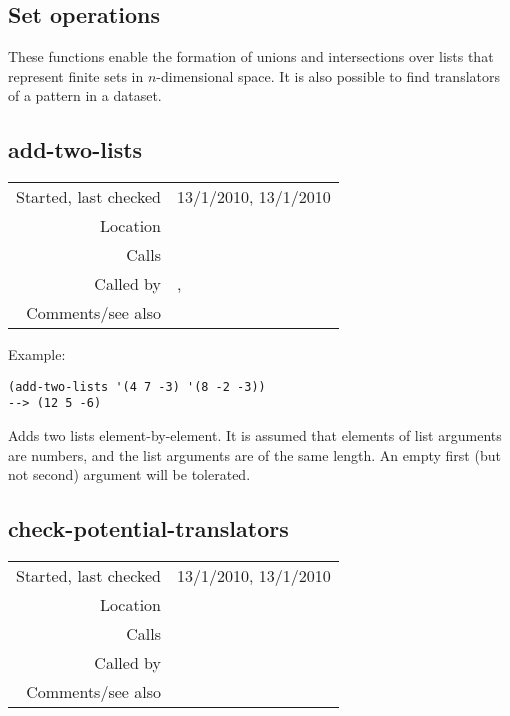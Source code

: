 \subsection{Set operations}\label{sec:set-operations}

These functions enable the formation of
unions and intersections over lists that represent
finite sets in $n$-dimensional space. It is also
possible to find translators of a pattern in a
dataset.


\subsection*{add-two-lists}\label{fun:add-two-lists}

\vspace{0.3cm}
\begin{tabular}{r|p{8cm}}
Started, last checked & 13/1/2010, 13/1/2010 \\
Location & \nameref{sec:set-operations} \\
Calls & \\
Called by & \nameref{fun:test-equal<potential-translator}, \nameref{fun:translation} \\
Comments/see also & \nameref{fun:add-two-lists-mod-2nd-n}
\end{tabular}

\vspace{0.5cm}
\noindent Example:
\begin{verbatim}
(add-two-lists '(4 7 -3) '(8 -2 -3))
--> (12 5 -6)
\end{verbatim}

\noindent Adds two lists element-by-element. It is
assumed that elements of list arguments are numbers,
and the list arguments are of the same length. An
empty first (but not second) argument will be
tolerated.


\subsection*{check-potential-translators}\label{fun:check-potential-translators}

\vspace{0.3cm}
\begin{tabular}{r|p{8cm}}
Started, last checked & 13/1/2010, 13/1/2010 \\
Location & \nameref{sec:set-operations} \\
Calls & \nameref{fun:test-equal<potential-translator} \\
Called by & \nameref{fun:translators-of-pattern-in-dataset} \\
Comments/see also & \nameref{fun:check-potential-translators-mod-2nd-n}
\end{tabular}

